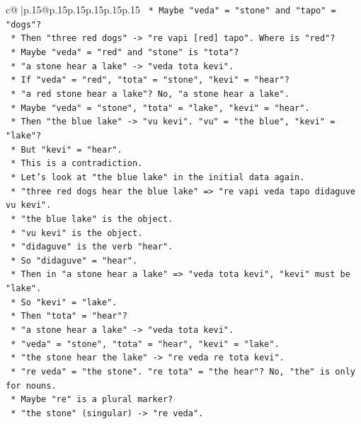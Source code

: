 \documentclass{article}
\begin{document}
{\begin{supertabular}{c@{$\;$}|p{.15\linewidth}@{}p{.15\linewidth}p{.15\linewidth}p{.15\linewidth}p{.15\linewidth}p{.15\linewidth}}
{{{\texttt{    *   Maybe "veda" = "stone" and "tapo" = "dogs"?} \\
\texttt{    *   Then "three red dogs" {-}> "re vapi {[}red{]} tapo". Where is "red"?} \\
\texttt{    *   Maybe "veda" = "red" and "stone" is "tota"?} \\
\texttt{    *   "a stone hear a lake" {-}> "veda tota kevi".} \\
\texttt{    *   If "veda" = "red", "tota" = "stone", "kevi" = "hear"?} \\
\texttt{    *   "a red stone hear a lake"? No, "a stone hear a lake".} \\
\texttt{    *   Maybe "veda" = "stone", "tota" = "lake", "kevi" = "hear".} \\
\texttt{    *   Then "the blue lake" {-}> "vu kevi". "vu" = "the blue", "kevi" = "lake"?} \\
\texttt{    *   But "kevi" = "hear".} \\
\texttt{    *   This is a contradiction.} \\
\texttt{    *   Let's look at "the blue lake" in the initial data again.} \\
\texttt{    *   "three red dogs hear the blue lake" => "re vapi veda tapo didaguve vu kevi".} \\
\texttt{    *   "the blue lake" is the object.} \\
\texttt{    *   "vu kevi" is the object.} \\
\texttt{    *   "didaguve" is the verb "hear".} \\
\texttt{    *   So "didaguve" = "hear".} \\
\texttt{    *   Then in "a stone hear a lake" => "veda tota kevi", "kevi" must be "lake".} \\
\texttt{    *   So "kevi" = "lake".} \\
\texttt{    *   Then "tota" = "hear"?} \\
\texttt{    *   "a stone hear a lake" {-}> "veda tota kevi".} \\
\texttt{    *   "veda" = "stone", "tota" = "hear", "kevi" = "lake".} \\
\texttt{    *   "the stone hear the lake" {-}> "re veda re tota kevi".} \\
\texttt{    *   "re veda" = "the stone". "re tota" = "the hear"? No, "the" is only for nouns.} \\
\texttt{    *   Maybe "re" is a plural marker?} \\
\texttt{    *   "the stone" (singular) {-}> "re veda".} \\
}}}
\end{supertabular}}
\end{document}
